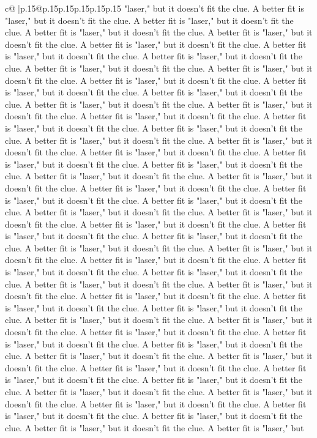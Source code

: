 \documentclass{article}
\begin{document}
{\begin{supertabular}{c@{$\;$}|p{.15\linewidth}@{}p{.15\linewidth}p{.15\linewidth}p{.15\linewidth}p{.15\linewidth}p{.15\linewidth}}
{{{"laser," but it doesn't fit the clue. A better fit is "laser," but it doesn't fit the clue. A better fit is "laser," but it doesn't fit the clue. A better fit is "laser," but it doesn't fit the clue. A better fit is "laser," but it doesn't fit the clue. A better fit is "laser," but it doesn't fit the clue. A better fit is "laser," but it doesn't fit the clue. A better fit is "laser," but it doesn't fit the clue. A better fit is "laser," but it doesn't fit the clue. A better fit is "laser," but it doesn't fit the clue. A better fit is "laser," but it doesn't fit the clue. A better fit is "laser," but it doesn't fit the clue. A better fit is "laser," but it doesn't fit the clue. A better fit is "laser," but it doesn't fit the clue. A better fit is "laser," but it doesn't fit the clue. A better fit is "laser," but it doesn't fit the clue. A better fit is "laser," but it doesn't fit the clue. A better fit is "laser," but it doesn't fit the clue. A better fit is "laser," but it doesn't fit the clue. A better fit is "laser," but it doesn't fit the clue. A better fit is "laser," but it doesn't fit the clue. A better fit is "laser," but it doesn't fit the clue. A better fit is "laser," but it doesn't fit the clue. A better fit is "laser," but it doesn't fit the clue. A better fit is "laser," but it doesn't fit the clue. A better fit is "laser," but it doesn't fit the clue. A better fit is "laser," but it doesn't fit the clue. A better fit is "laser," but it doesn't fit the clue. A better fit is "laser," but it doesn't fit the clue. A better fit is "laser," but it doesn't fit the clue. A better fit is "laser," but it doesn't fit the clue. A better fit is "laser," but it doesn't fit the clue. A better fit is "laser," but it doesn't fit the clue. A better fit is "laser," but it doesn't fit the clue. A better fit is "laser," but it doesn't fit the clue. A better fit is "laser," but it doesn't fit the clue. A better fit is "laser," but it doesn't fit the clue. A better fit is "laser," but it doesn't fit the clue. A better fit is "laser," but it doesn't fit the clue. A better fit is "laser," but it doesn't fit the clue. A better fit is "laser," but it doesn't fit the clue. A better fit is "laser," but it doesn't fit the clue. A better fit is "laser," but it doesn't fit the clue. A better fit is "laser," but it doesn't fit the clue. A better fit is "laser," but it doesn't fit the clue. A better fit is "laser," but it doesn't fit the clue. A better fit is "laser," but it doesn't fit the clue. A better fit is "laser," but it doesn't fit the clue. A better fit is "laser," but it doesn't fit the clue. A better fit is "laser," but it doesn't fit the clue. A better fit is "laser," but it doesn't fit the clue. A better fit is "laser," but it doesn't fit the clue. A better fit is "laser," but it doesn't fit the clue. A better fit is "laser," but it doesn't fit the clue. A better fit is "laser," but it doesn't fit the clue. A better fit is "laser," but it doesn't fit the clue. A better fit is "laser," but it doesn't fit the clue. A better fit is "laser," but it doesn't fit the clue. A better fit is "laser," but it doesn't fit the clue. A better fit is "laser," but }}}
\end{supertabular}}
\end{document}
